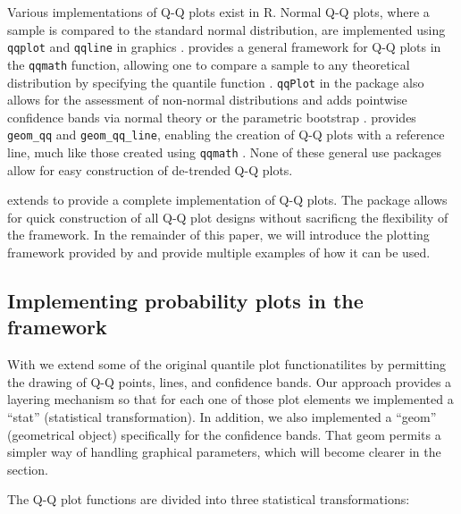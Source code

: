 Various implementations of Q-Q plots exist in R. Normal Q-Q plots, where
a sample is compared to the standard normal distribution, are
implemented using \texttt{qqplot} and \texttt{qqline} in 
graphics \citep{R}.  provides a general framework for Q-Q
plots in the \texttt{qqmath} function, allowing one to compare a sample
to any theoretical distribution by specifying the quantile function
\citep{lattice}. \texttt{qqPlot} in the  package also allows
for the assessment of non-normal distributions and adds pointwise
confidence bands via normal theory or the parametric bootstrap
\citep{car}.  provides \texttt{geom\_qq} and
\texttt{geom\_qq\_line}, enabling the creation of Q-Q plots with a
reference line, much like those created using \texttt{qqmath}
\citep{ggplot2}. None of these general use packages allow for easy
construction of de-trended Q-Q plots.

 extends  to provide a complete implementation
of Q-Q plots. The package allows for quick construction of all Q-Q plot
designs without sacrificng the flexibility of the 
framework. In the remainder of this paper, we will introduce the
plotting framework provided by  and provide multiple
examples of how it can be used.

\subsection{\texorpdfstring{Implementing probability plots in the
framework}{Implementing probability plots in the  framework}}\label{implementing-probability-plots-in-the-framework}

With  we extend some of the original  quantile
plot functionatilites by permitting the drawing of Q-Q points, lines,
and confidence bands. Our approach provides a  layering
mechanism so that for each one of those plot elements we implemented a
 ``stat'' (statistical transformation). In addition, we
also implemented a  ``geom'' (geometrical object)
specifically for the confidence bands. That geom permits a simpler way
of handling graphical parameters, which will become clearer in the
 section.

The Q-Q plot functions are divided into three statistical
transformations:

